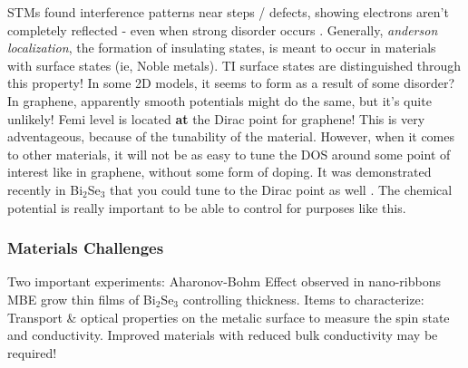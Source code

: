 \documentclass{article} %
\newcommand{\bismuthselinide}[1]{Bi$_2$Se$_3$#1}
\begin{document}
\begin{outline}
	\2 STMs found interference patterns near steps / defects, showing electrons aren't completely reflected - even when strong disorder occurs \cite{roushan_topological_2009,alpichshev_stm_2010, zhang_experimental_2009}. 
	\3 Generally, \textit{anderson localization}, the formation of insulating states, is meant to occur in materials with surface states (ie, Noble metals).
	\3 TI surface states are distinguished through this property! 
	\3 In some 2D models, it seems to form as a result of some disorder?
	\3 In graphene, apparently smooth potentials might do the same, but it's quite unlikely!
	\2 Femi level is located \textbf{at} the Dirac point for graphene! This is very adventageous, because of the tunability of the material. However, when it comes to other materials, it will not be as easy to tune the DOS around some point of interest like in graphene, without some form of doping. It was demonstrated recently in \bismuthselinide{} that you could tune to the Dirac point as well \cite{hsieh_tunable_2009}. The chemical potential is really important to be able to control for purposes like this. 	
	
	\end{outline}

	\subsubsection{Materials Challenges}
	\begin{outline}
		\1 Two important experiments:
			\2 Aharonov-Bohm Effect observed in nano-ribbons
			\2 MBE grow thin films of \bismuthselinide{} controlling thickness.
		\1 Items to characterize:
			\2 Transport \& optical properties on the metalic surface to measure the spin state and conductivity.
			\2 Improved materials with reduced bulk conductivity may be required!
	\end{outline}
\end{document}
